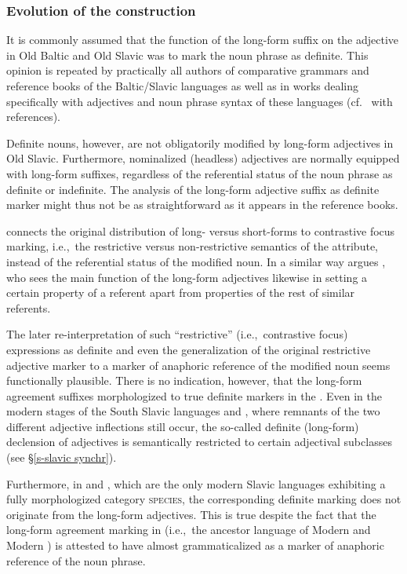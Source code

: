 \subsubsection{Evolution of the construction} 
It is commonly assumed that the function of the long-form suffix on the adjective in Old Baltic and Old Slavic was to mark the noun phrase as definite. This opinion is repeated by practically all authors of comparative grammars and reference books of the Baltic\slash{}Slavic languages as well as in works dealing specifically with adjectives and noun phrase syntax of these languages (cf.~\citealt[211]{mendoza2004} with references).

Definite nouns, however, are not obligatorily modified by long-form adjectives in Old Slavic. Furthermore, nominalized (headless) adjectives are normally equipped with long-form suffixes, regardless of the referential status of the noun phrase as definite or indefinite. The analysis of the long-form adjective suffix as definite marker might thus not be as straightforward as it appears in the reference books. 

\citet[214–215]{mendoza2004} connects the original distribution of long- versus short-forms to contrastive focus marking, i.e.,~the restrictive versus non\hyp{}restrictive semantics of the attribute, instead of the referential status of the modified noun. In a similar way argues \citet{tolstoj1957}, who sees the main function of the long-form adjectives likewise in setting a certain property of a referent apart from properties of the rest of similar referents. 

The later re-interpretation of such “restrictive” (i.e.,~contrastive focus) expressions as definite and even the generalization of the original restrictive adjective marker to a marker of anaphoric reference of the modified noun seems functionally plausible. There is no indication, however, that the long-form agreement suffixes morphologized to true definite markers in the . Even in the modern stages of the South Slavic languages  and , where remnants of the two different adjective inflections still occur, the so-called definite (long-form) declension of adjectives is semantically restricted to certain adjectival subclasses (see \S\ref{s-slavic synchr}).

Furthermore, in  and , which are the only modern Slavic languages exhibiting a fully morphologized category \textsc{species}, the corresponding definite marking does not originate from the long-form adjectives. This is true despite the fact that the long-form agreement marking in  (i.e.,~the ancestor language of Modern  and Modern ) is attested to have almost grammaticalized as a marker of anaphoric reference of the noun phrase.

